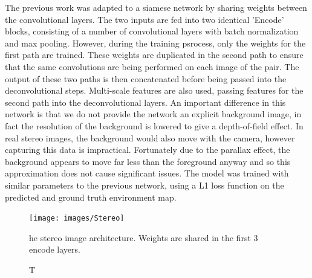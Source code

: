 \documentclass[ %
                    author={Gavin Parker},
                supervisor={Dr. Neill Campbell},
                    degree={MEng},
                     title={Deep Siamese Networks for Illumination Estimation from Stereo Images},
                  subtitle={},
                      type={research},
                      year={2018} ]{dissertation}
\begin{document}
The previous work was adapted to a siamese network by sharing weights between the convolutional layers. The two inputs are fed into two identical 'Encode' blocks, consisting of a number of convolutional layers with batch normalization and max pooling. However, during the training psrocess, only the weights for the first path are trained. These weights are duplicated in the second path to ensure that the same convolutions are being performed on each image of the pair. The output of these two paths is then concatenated before being passed into the deconvolutional steps. Multi-scale features are also used, passing features for the second path into the deconvolutional layers. An important difference in this network is that we do not provide the network an explicit background image, in fact the resolution of the background is lowered to give a depth-of-field effect. In real stereo images, the background would also move with the camera, however capturing this data is impractical. Fortunately due to the parallax effect, the background appears to move far less than the foreground anyway and so this approximation does not cause significant issues. The model was trained with similar parameters to the previous network, using a L1 loss function on the predicted and ground truth environment map.
\begin{figure}
\texttt{[image: images/Stereo]}
\caption The stereo image architecture. Weights are shared in the first 3 encode layers.
\end{figure}
\end{document}
